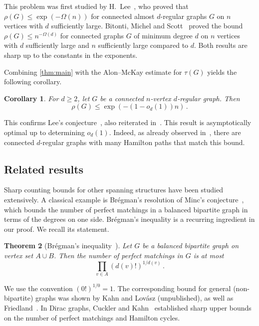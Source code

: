 \documentclass[reqno,final,a4paper]{amsart}
\numberwithin{equation}{section}
\newtheorem{theorem}{Theorem}[section]
\newtheorem{corollary}[theorem]{Corollary}
\theoremstyle{definition}
\theoremstyle{remark}
\begin{document}
This problem was first studied by H.~Lee~\cite{Lee}, who proved that $\rho(G)\leq \exp(-\Omega(n))$ for connected almost $d$-regular graphs $G$ on $n$ vertices with $d$ sufficiently large. Bitonti, Michel and Scott~\cite{BitontiMichelScott} proved the bound $\rho(G)\leq n^{-\Omega(d)}$ for connected graphs $G$ of minimum degree $d$ on $n$ vertices with $d$ sufficiently large and $n$ sufficiently large compared to $d$. Both results are sharp up to the constants in the exponents.


Combining \cref{thm:main} with the Alon--McKay estimate for $\tau(G)$ yields the following corollary.
\begin{corollary}\label{cor:anticoncentration}
    For $d\geq 2$, let $G$ be a connected $n$-vertex $d$-regular graph. Then
    \[
        \rho(G)\leq \exp(-(1-o_d(1))n)\,.
    \]
\end{corollary}
This confirms Lee's conjecture~\cite[Conjecture 4.3]{Lee}, also reiterated in~\cite{Wang}.
This result is asymptotically optimal up to determining $o_d(1)$. Indeed, as already observed in~\cite{Lee}, there are connected $d$-regular graphs with many Hamilton paths that match this bound.

\subsection{Related results}
Sharp counting bounds for other spanning structures have been studied extensively. A classical example is Br\'egman's resolution of Minc's conjecture~\cite{Bregman1973}, which bounds the number of perfect matchings in a balanced bipartite graph in terms of the degrees on one side. Br\'egman's inequality is a recurring ingredient in our proof. We recall its statement.
\begin{theorem}[Br\'egman's inequality~\cite{Bregman1973}]\label{thm:bregman}
    Let $G$ be a balanced bipartite graph on vertex set $A\cup B$. Then the number of perfect matchings in $G$ is at most 
    \[
        \prod_{v\in A} (d(v)!)^{1/d(v)}\,.
    \]
\end{theorem}
We use the convention $(0!)^{1/0} = 1$.
The corresponding bound for general (non-bipartite) graphs was shown by Kahn and Lov\'asz (unpublished), as well as Friedland~\cite{Alon-Friedland,friedland2008upper,cutler2011entropy}. 
In Dirac graphs, Cuckler and Kahn~\cite{Cuckler-Kahn-Entropy} established sharp upper bounds on the number of perfect matchings and Hamilton cycles. 
\end{document}
